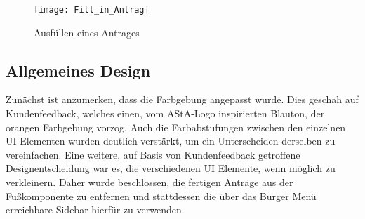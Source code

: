 \begin{figure}[h]
\centering
\texttt{[image: Fill\_in\_Antrag]}
\caption{Ausfüllen eines Antrages}\label{Ausfüllen eines Antrages}
\end{figure}

\subsection{Allgemeines Design}\label{Allgemeines Design}
Zunächst ist anzumerken, dass die Farbgebung angepasst wurde. Dies geschah auf
Kundenfeedback, welches einen, vom \ac{AStA}-Logo inspirierten Blauton, der orangen
Farbgebung vorzog. Auch die Farbabstufungen zwischen den einzelnen \ac{UI} Elementen
wurden deutlich verstärkt, um ein Unterscheiden derselben zu vereinfachen.
Eine weitere, auf Basis von Kundenfeedback getroffene Designentscheidung war es, die
verschiedenen \ac{UI} Elemente, wenn möglich zu verkleinern. Daher wurde beschlossen, die
fertigen Anträge aus der Fußkomponente zu entfernen und stattdessen die über das Burger
Menü erreichbare Sidebar hierfür zu verwenden.

